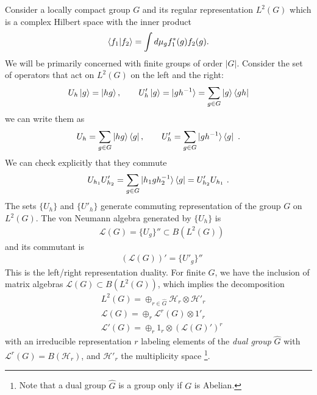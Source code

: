 \documentclass{article}
\newcommand{\nn}{\nonumber}
\theoremstyle{definition}
\begin{document}
Consider a locally compact group $G$ and its regular representation $L^2(G)$ which is a complex Hilbert space with the inner product
\begin{eqnarray}
    \braket{f_1|f_2}=\int d\mu_g f_1^*(g) f_2(g).
\end{eqnarray}
We will be primarily concerned with finite groups of order $|G|$. Consider the set of operators that act on $L^2(G)$ on the left and the right:
\begin{eqnarray}
    U_h\ket{g}=\ket{h g}, \qquad U'_h\ket{g}=\ket{g h^{-1}}=\sum_{g\in G}\ket{g}\bra{g h}
\end{eqnarray}
we can write them as
\begin{eqnarray}
U_h=\sum_{g\in G}\ket{h g}\bra{g},\qquad U'_h=\sum_{g\in G}\ket{g h^{-1}}\bra{g}\ .
\end{eqnarray}
We can check explicitly that they commute
\begin{eqnarray}
    U_{h_1}U'_{h_2}=\sum_{g\in G}\ket{h_1 g h_2^{-1}}\bra{g}=U'_{h_2}U_{h_1}\ .
\end{eqnarray}
The sets $\{U_h\}$ and $\{U'_h\}$ generate commuting representation of the group $G$ on $L^2(G)$. 
The von Neumann algebra generated by $\{U_h\}$ is 
\begin{align}
    &\mathcal{L}(G)=\{U_g\}''\subset B(L^2(G))
\end{align}
and its commutant is 
\begin{align}
    &(\mathcal{L}(G))'=\{U'_g\}''
\end{align}
This is the left/right representation duality.
For finite $G$, we have the inclusion of matrix algebras $\mathcal{L}(G)\subset B(L^2(G))$, which implies the decomposition
\begin{align}
&L^2(G)=\oplus_{r\in\hat{G}} \mathcal{H}_r\otimes \mathcal{H}'_r\nn\\
    &\mathcal{L}(G)=\oplus_r \mathcal{L}^r(G)\otimes 1'_r\nn\\
    &\mathcal{L}'(G)=\oplus_r 1_r\otimes (\mathcal{L}(G)')^{r}
\end{align}
with an irreducible representation $r$ labeling elements of the {\it dual group} $\hat{G}$ with $\mathcal{L}^r(G)=B(\mathcal{H}_r)$, and $\mathcal{H}'_r$ the multiplicity space \footnote{Note that a dual group $\hat{G}$ is a group only if $G$ is Abelian.}. 
\end{document}
